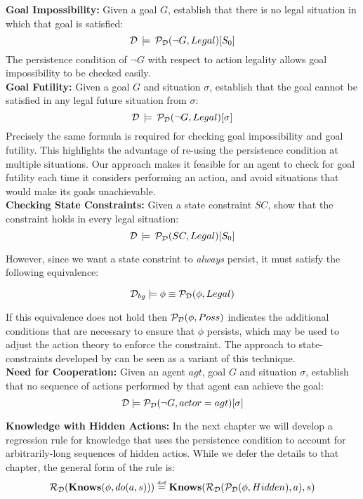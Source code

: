 \textbf{Goal Impossibility:} Given a goal $G$, establish that there
is no legal situation in which that goal is satisfied:\[
\mathcal{D}\,\models\,\mathcal{P}_{\mathcal{D}}(\neg G,Legal)[S_{0}]\]
 The persistence condition of $\neg G$ with respect to action legality
allows goal impossibility to be checked easily.\\


\textbf{Goal Futility:} Given a goal $G$ and situation $\sigma$,
establish that the goal cannot be satisfied in any legal future situation
from $\sigma$:\[
\mathcal{D}\,\models\,\mathcal{P}_{\mathcal{D}}(\neg G,Legal)[\sigma]\]
 Precisely the same formula is required for checking goal impossibility
and goal futility. This highlights the advantage of re-using the persistence
condition at multiple situations. Our approach makes it feasible for
an agent to check for goal futility each time it considers performing
an action, and avoid situations that would make its goals unachievable.\\


\textbf{Checking State Constraints:} Given a state constraint $SC$,
show that the constraint holds in every legal situation:\[
\mathcal{D}\,\models\,\mathcal{P}_{\mathcal{D}}(SC,Legal)[S_{0}]\]


However, since we want a state constrint to \emph{always} persist,
it must satisfy the following equivalence:

\[
\mathcal{D}_{bg}\models\phi\equiv\mathcal{P}_{\mathcal{D}}(\phi,Legal)\]


If this equivalence does not hold then $\mathcal{P}_{\mathcal{D}}(\phi,Poss)$
indicates the additional conditions that are necessary to ensure that
$\phi$ persists, which may be used to adjust the action theory to
enforce the constraint. The approach to state-constraints developed
by \citet{Lin94-StateConstraints} can be seen as a variant of this
technique.\\


\textbf{Need for Cooperation:} Given an agent $agt$, goal $G$ and
situation $\sigma$, establish that no sequence of actions performed
by that agent can achieve the goal:\[
\mathcal{D}\models\mathcal{P}_{\mathcal{D}}(\neg G,actor=agt)[\sigma]\]


\textbf{Knowledge with Hidden Actions:} In the next chapter we will
develop a regression rule for knowledge that uses the persistence
condition to account for arbitrarily-long sequences of hidden actios.
While we defer the details to that chapter, the general form of the
rule is:\[
\mathcal{R}_{\mathcal{D}}(\mathbf{Knows}(\phi,do(a,s)))\stackrel{\mbox{\tiny def}}{=}\mathbf{Knows}(\mathcal{R}_{\mathcal{D}}(\mathcal{P}_{\mathcal{D}}(\phi,Hidden),a),s)\]



